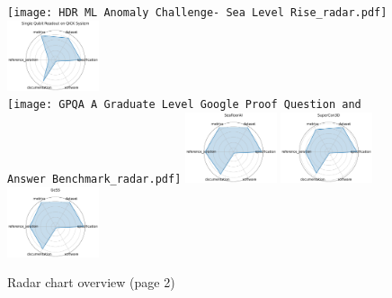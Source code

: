 \documentclass{article}
\begin{document}
\begin{figure}[ht!]
\texttt{[image: HDR ML Anomaly Challenge- Sea Level Rise\_radar.pdf]}
\includegraphics[width=0.2400\textwidth]{Single Qubit Readout on QICK System_radar.pdf}
\\[1ex]
\texttt{[image: GPQA A Graduate Level Google Proof Question and Answer Benchmark\_radar.pdf]}
\includegraphics[width=0.2400\textwidth]{SeafloorAI_radar.pdf}
\includegraphics[width=0.2400\textwidth]{SuperCon3D_radar.pdf}
\includegraphics[width=0.2400\textwidth]{GeSS_radar.pdf}
\\[1ex]
\caption{Radar chart overview (page 2)}
\end{figure}


\clearpage
\end{document}
